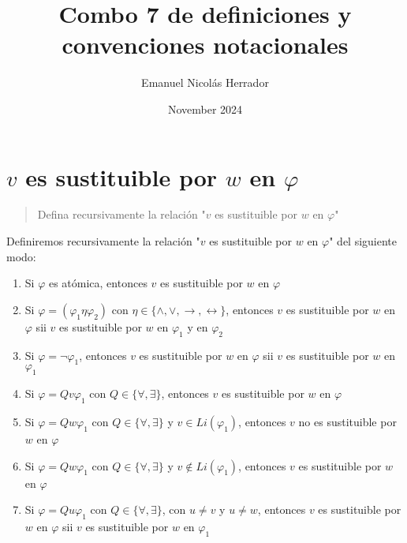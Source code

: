 \documentclass{article}
\title{Combo 7 de definiciones y convenciones notacionales}
\author{Emanuel Nicolás Herrador}
\date{November 2024}
\begin{document}
\maketitle

\section{$v$ es sustituible por $w$ en $\varphi$}
\begin{quote}
  Defina recursivamente la relación "$v$ es sustituible por $w$ en $\varphi$"
\end{quote}
Definiremos recursivamente la relación "$v$ es sustituible por $w$ en $\varphi$" del siguiente modo:
\begin{enumerate}
  \item Si $\varphi$ es atómica, entonces $v$ es sustituible por $w$ en $\varphi$
  \item Si $\varphi=(\varphi_1\eta\varphi_2)$ con $\eta\in\{\land,\lor,\to,\leftrightarrow\}$, entonces $v$ es sustituible por $w$ en $\varphi$ sii $v$ es sustituible por $w$ en $\varphi_1$ y en $\varphi_2$
  \item Si $\varphi=\neg\varphi_1$, entonces $v$ es sustituible por $w$ en $\varphi$ sii $v$ es sustituible por $w$ en $\varphi_1$
  \item Si $\varphi=Qv\varphi_1$ con $Q\in\{\forall,\exists\}$, entonces $v$ es sustituible por $w$ en $\varphi$
  \item Si $\varphi=Qw\varphi_1$ con $Q\in\{\forall,\exists\}$ y $v\in Li(\varphi_1)$, entonces $v$ no es sustituible por $w$ en $\varphi$
  \item Si $\varphi=Qw\varphi_1$ con $Q\in\{\forall,\exists\}$ y $v\notin Li(\varphi_1)$, entonces $v$ es sustituible por $w$ en $\varphi$
  \item Si $\varphi=Qu\varphi_1$ con $Q\in\{\forall,\exists\}$, con $u\neq v$ y $u\neq w$, entonces $v$ es sustituible por $w$ en $\varphi$ sii $v$ es sustituible por $w$ en $\varphi_1$
\end{enumerate}
\end{document}
